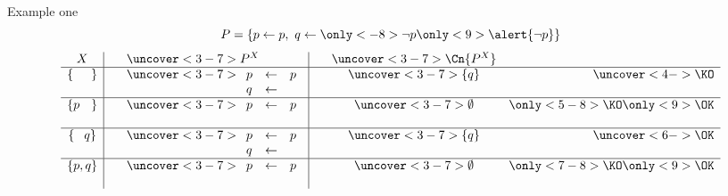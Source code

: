 \begin{frame}{Example one}
\[
P
=
\left\{
    p \leftarrow p, \
    q \leftarrow \only<-8>{\neg p}\only<9>{\alert{\neg p}}
\right\}
\]
\pause
\newcommand{\PIip}{%
    \begin{array}[t]{lll}
      p &\leftarrow&p
      \\
       &&
    \end{array}}
\newcommand{\PIop}{%
    \begin{array}[t]{lll}
      p &\leftarrow&p
      \\
      q &\leftarrow&
    \end{array}}
\[
\begin{array}{c|cl|ccr}
       X                   &\ &\uncover<3-7>{P^X}&\ &\uncover<3-7>{\Cn{P^X}}&                              \\\hline
\{\phantom{p         ,q}\} &  &\uncover<3-7>{\PIop}&  &\uncover<3-7>{\{q\}}     &\uncover<4->{\KO}             \\\hline
\{         p\phantom{,q}\} &  &\uncover<3-7>{\PIip}&  &\uncover<3-7>{\emptyset} &  \only<5-8>{\KO}\only<9>{\OK}\\\hline
\{\phantom{p,}        q \} &  &\uncover<3-7>{\PIop}&  &\uncover<3-7>{\{q\}}     &\uncover<6->{\OK}             \\\hline
\{         p         ,q \} &  &\uncover<3-7>{\PIip}&  &\uncover<3-7>{\emptyset} &  \only<7-8>{\KO}\only<9>{\OK}
\end{array}
\]

\end{frame}
